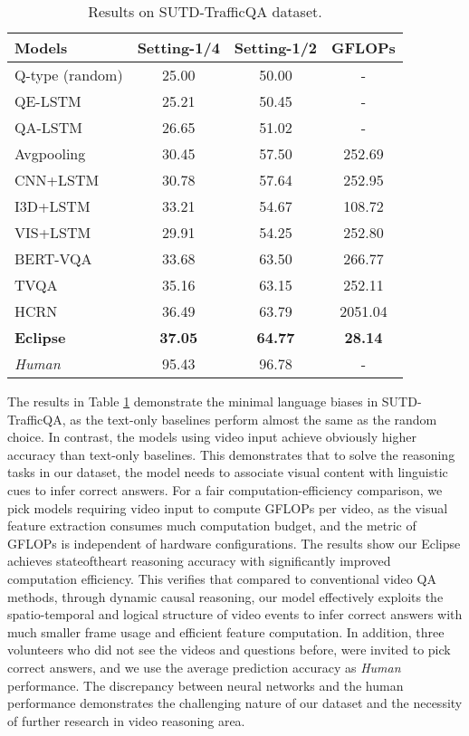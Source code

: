\documentclass[final]{cvpr}
\begin{document}
\begin{table}[t]
\vspace{-0.2cm}
\caption{Results on SUTD-TrafficQA dataset. 
}
\setlength\abovecaptionskip{-2cm}
\setlength\belowcaptionskip{-2cm}
\setlength{\tabcolsep}{10pt}
\scriptsize
\begin{center}
\begin{tabular}{l|ccc}
\hline
Models & Setting-1/4 & Setting-1/2 & GFLOPs  \\\hline
Q-type (random)& 25.00 & 50.00 & - \\ 
QE-LSTM & 25.21 & 50.45 & - \\ 
QA-LSTM & 26.65 & 51.02 & -  \\ \hline
Avgpooling & 30.45& 57.50 & 252.69 \\ 
CNN+LSTM & 30.78 & 57.64 & 252.95  \\ 
I3D+LSTM & 33.21 & 54.67 & 108.72  \\
VIS+LSTM \cite{ren2015exploring} & 29.91 & 54.25 & 252.80\\
BERT-VQA \cite{Yang_2020_WACV} & 33.68 & 63.50 & 266.77 \\ 
TVQA \cite{lei2018tvqa} & 35.16 & 63.15 & 252.11  \\ 
HCRN \cite{Le_2020_CVPR} & 36.49 & 63.79 & 2051.04 \\ 
\textbf{Eclipse}  & \textbf{37.05} & \textbf{64.77} & \textbf{28.14} \\ \hline
\textit{Human}    &  95.43    & 96.78 & -\\ \hline
\end{tabular}
\end{center}
\label{table:baseline_comparison}
\vspace{-0.5cm}
\end{table}

The results in Table \ref{table:baseline_comparison}
demonstrate the minimal language biases in SUTD-TrafficQA, as the text-only baselines perform almost the same as the random choice. In contrast, the models using video input achieve obviously higher accuracy than text-only baselines. This demonstrates that to solve the reasoning tasks in our dataset, the model needs to associate visual content with linguistic cues to infer correct answers. For a fair computation-efficiency comparison, we pick models requiring video input to compute GFLOPs per video, as the visual feature extraction consumes much computation budget, and the metric of GFLOPs is independent of hardware configurations. The results show our Eclipse achieves state\text{-}of\text{-}the\text{-}art reasoning accuracy 
with significantly improved computation efficiency. This verifies that compared to conventional video QA  methods, through dynamic causal reasoning, our model effectively exploits the spatio-temporal and logical structure of video events to infer correct answers with much smaller frame usage and efficient feature computation.
In addition, three volunteers who did not see the videos and questions before, were invited to pick correct answers, and we use the average prediction accuracy as \textit{Human} performance. The discrepancy between neural networks and the human performance demonstrates the challenging nature of our dataset and the necessity of further research in video reasoning area.
\end{document}
